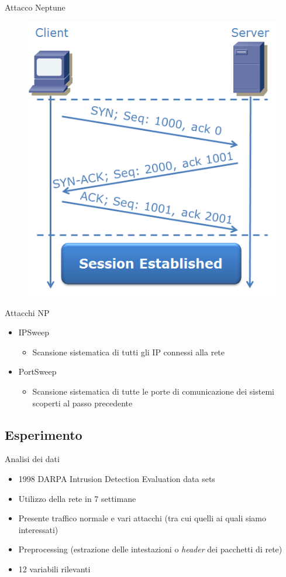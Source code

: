 \documentclass[xcolor={dvipsnames}]{beamer}%
\begin{document}
		\begin{frame}{Attacco Neptune}
			\begin{figure}
				\begin{center}
					\includegraphics[width=.5\textwidth]{3wayh}
				\end{center}
			\end{figure}
		\end{frame}
		
		\begin{frame}{Attacchi NP}
			\begin{itemize}
				\item IPSweep
				\begin{itemize}
					\item Scansione sistematica di tutti gli IP connessi alla rete
				\end{itemize}
				\item PortSweep
				\begin{itemize}
					\item Scansione sistematica di tutte le porte di comunicazione dei sistemi scoperti al passo precedente
				\end{itemize}
			\end{itemize}
		\end{frame}
	
	\subsection{Esperimento}
	
		\begin{frame}{Analisi dei dati}
			\begin{itemize}
				\item 1998 DARPA Intrusion Detection Evaluation data sets
				\item Utilizzo della rete in 7 settimane
				\item Presente traffico normale e vari attacchi (tra cui quelli ai quali siamo interessati)
				\item Preprocessing (estrazione delle intestazioni o \emph{header} dei pacchetti di rete)
				\item 12 variabili rilevanti
			\end{itemize}				
		\end{frame}
	
\end{document}
